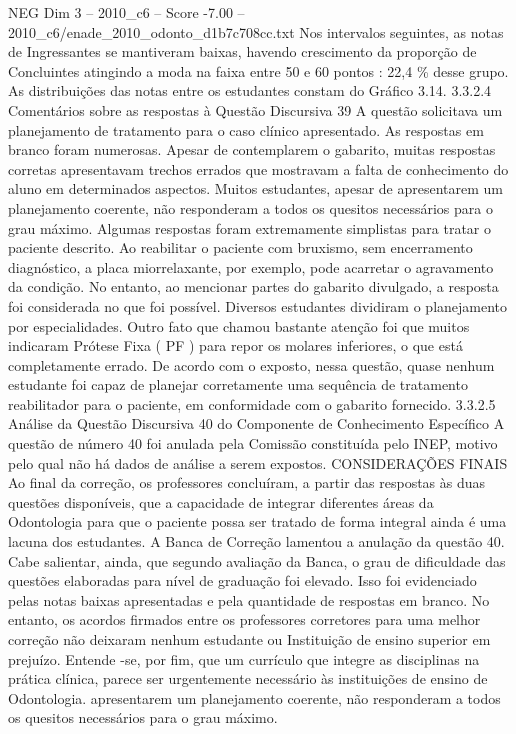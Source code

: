 \begin{textsample}{NEG Dim 3 – 2010\_c6 – Score -7.00 – 2010\_c6/enade\_2010\_odonto\_d1b7c708cc.txt}
Nos intervalos seguintes, as notas de Ingressantes se mantiveram baixas, havendo crescimento da proporção de Concluintes atingindo a moda na faixa entre 50 e 60 pontos : 22,4 \% desse grupo.
As distribuições das notas entre os estudantes constam do Gráfico 3.14. 3.3.2.4 Comentários sobre as respostas à Questão Discursiva 39 A questão solicitava um planejamento de tratamento para o caso clínico apresentado.
As respostas em branco foram numerosas.
Apesar de contemplarem o gabarito, muitas respostas corretas apresentavam trechos errados que mostravam a falta de conhecimento do aluno em determinados aspectos.
Muitos estudantes, apesar de apresentarem um planejamento coerente, não responderam a todos os quesitos necessários para o grau máximo.
Algumas respostas foram extremamente simplistas para tratar o paciente descrito.
Ao reabilitar o paciente com bruxismo, sem encerramento diagnóstico, a placa miorrelaxante, por exemplo, pode acarretar o agravamento da condição.
No entanto, ao mencionar partes do gabarito divulgado, a resposta foi considerada no que foi possível.
Diversos estudantes dividiram o planejamento por especialidades.
Outro fato que chamou bastante atenção foi que muitos indicaram Prótese Fixa ( PF ) para repor os molares inferiores, o que está completamente errado.
De acordo com o exposto, nessa questão, quase nenhum estudante foi capaz de planejar corretamente uma sequência de tratamento reabilitador para o paciente, em conformidade com o gabarito fornecido. 3.3.2.5 Análise da Questão Discursiva 40 do Componente de Conhecimento Específico A questão de número 40 foi anulada pela Comissão constituída pelo INEP, motivo pelo qual não há dados de análise a serem expostos.
CONSIDERAÇÕES FINAIS Ao final da correção, os professores concluíram, a partir das respostas às duas questões disponíveis, que a capacidade de integrar diferentes áreas da Odontologia para que o paciente possa ser tratado de forma integral ainda é uma lacuna dos estudantes.
A Banca de Correção lamentou a anulação da questão 40.
Cabe salientar, ainda, que segundo avaliação da Banca, o grau de dificuldade das questões elaboradas para nível de graduação foi elevado.
Isso foi evidenciado pelas notas baixas apresentadas e pela quantidade de respostas em branco.
No entanto, os acordos firmados entre os professores corretores para uma melhor correção não deixaram nenhum estudante ou Instituição de ensino superior em prejuízo.
Entende -se, por fim, que um currículo que integre as disciplinas na prática clínica, parece ser urgentemente necessário às instituições de ensino de Odontologia. apresentarem um planejamento coerente, não responderam a todos os quesitos necessários para o grau máximo.

\end{textsample}
